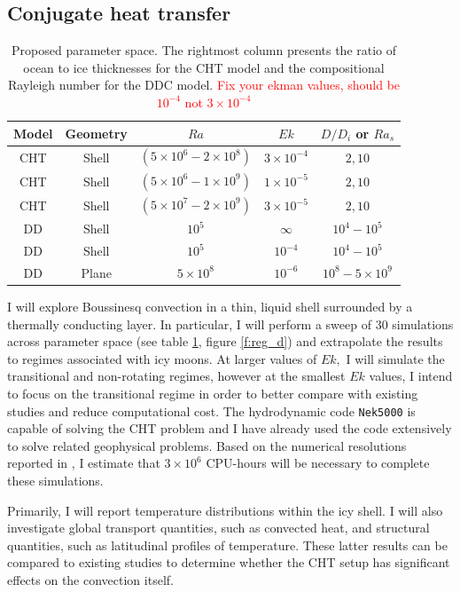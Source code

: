 \documentclass{article}
\def\lb{\left(}
\def\rb{\right)}
\begin{document}
\subsection{Conjugate heat transfer}
\begin{table}
\begin{center}
\begin{tabular}{|c|c|c|c|c|}
\hline
Model&Geometry&$Ra$&$Ek$&$D/D_{i}$ or $Ra_s$\\
\hline
CHT& Shell&$\lb 5 \times 10^{6} - 2 \times 10^{8} \rb $ & $3 \times 10^{-4} $ & $2,10$\\
\hline
CHT& Shell&$\lb 5 \times 10^{6} - 1 \times 10^{9} \rb $ & $1 \times 10^{-5} $ & $2,10$\\
\hline
CHT& Shell&$\lb 5 \times 10^{7} - 2 \times 10^{9} \rb $ & $3 \times 10^{-5} $ & $2,10$\\
\hline
DD& Shell & $10^5$& $\infty$&$10^4-10^5$\\
\hline
DD& Shell & $10^5$& $10^{-4}$&$10^4-10^5$\\
\hline
DD& Plane & $5\times10^8$& $10^{-6}$&$10^8-5\times10^9$\\
\hline
\end{tabular}
\end{center}
\caption{Proposed parameter space. The rightmost column presents the ratio of ocean to ice thicknesses for the CHT model and the compositional Rayleigh number for the DDC model. \textcolor{red}{Fix your ekman values, should be $10^{-4}$ not $3\times10^{-4}$}}
\label{t:param}
\end{table}
I will explore Boussinesq convection in a thin, liquid shell surrounded by a thermally conducting layer. 
In particular, I will perform a sweep of $30$ simulations across parameter space (see table \ref{t:param}, figure \ref{f:reg_d}) and extrapolate the results to regimes associated with icy moons.
At larger values of $Ek,$ I will simulate the transitional and non-rotating regimes, however at the smallest $Ek$ values, I intend to focus on the transitional regime in order to better compare with existing studies and reduce computational cost.
The hydrodynamic code \texttt{Nek5000}\citep{nek5000} is capable of solving the CHT problem and I have already used the code extensively to solve related geophysical problems. 
Based on the numerical resolutions reported in \citep{dL23}, I estimate that $3\times 10^{6}$ CPU-hours will be necessary to complete these simulations.

Primarily, I will report temperature distributions within the icy shell. I will also investigate global transport quantities, such as convected heat, and structural quantities, such as latitudinal profiles of temperature. 
These latter results can be compared to existing studies \citep{dL23,kS19,jK22} to determine whether the CHT setup has significant effects on the convection itself.
\end{document}
